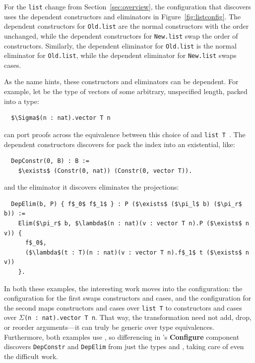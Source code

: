 For the \lstinline{list} change from Section~\ref{sec:overview},
the configuration that \toolnamec discovers uses the dependent constructors
and eliminators in Figure~\ref{fig:listconfig}. The dependent constructors for \lstinline{Old.list}
are the normal constructors with the order unchanged,
while the dependent constructors for \lstinline{New.list} swap the order of constructors.
Similarly, the dependent eliminator for \lstinline{Old.list} is the normal eliminator for \lstinline{Old.list},
while the dependent eliminator for \lstinline{New.list} swaps cases.

As the name hints, these constructors and eliminators can be dependent.
For example, let \B be the type of
vectors of some arbitrary, unspecified length,
packed into a \kl{$\Sigma$} type:

\begin{lstlisting}
  $\Sigma$(n : nat).vector T n
\end{lstlisting}
\toolnamec can port proofs across the equivalence between this choice of \B and \lstinline{list T}~\href{https://github.com/uwplse/pumpkin-pi/blob/v2.0.0/plugin/coq/examples/Example.v}{}. %
The dependent constructors \toolnamec discovers for \B pack the index into an existential, like:

\begin{lstlisting}
  DepConstr(0, B) : B :=
    $\exists$ (Constr(0, nat)) (Constr(0, vector T)).
\end{lstlisting}
and the eliminator it discovers eliminates the projections:

\begin{lstlisting}
  DepElim(b, P) { f$_0$ f$_1$ } : P ($\exists$ ($\pi_l$ b) ($\pi_r$ b)) :=
    Elim($\pi_r$ b, $\lambda$(n : nat)(v : vector T n).P ($\exists$ n v)) {
      f$_0$,
      ($\lambda$(t : T)(n : nat)(v : vector T n).f$_1$ t ($\exists$ n v))
    }.
\end{lstlisting}

In both these examples, the interesting work moves into the configuration:
the configuration for the first swaps constructors and cases,
and the configuration for the second maps constructors and cases over \lstinline{list T} to constructors and 
cases over $\Sigma$\lstinline{(n : nat).vector T n}. %
That way, the transformation need not add, drop, or reorder arguments---it can truly be generic over type equivalences.
Furthermore, both examples use , so differencing in \toolnamec's \textbf{Configure} component
discovers \lstinline{DepConstr} and \lstinline{DepElim} from just the types \Aa and \B, taking care of even the difficult work.


